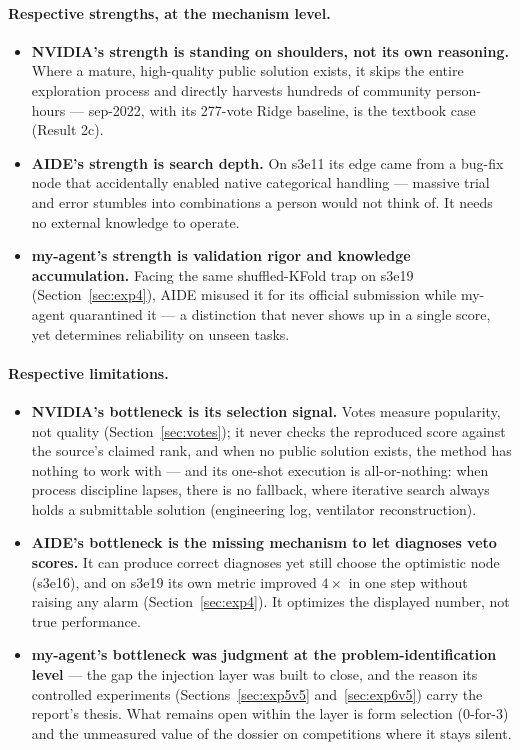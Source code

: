 \documentclass[11pt,a4paper]{article}
\begin{document}
\paragraph{Respective strengths, at the mechanism level.}
\begin{itemize}[leftmargin=*]
\item \textbf{NVIDIA's strength is standing on shoulders, not its own reasoning.} Where a mature, high-quality public solution exists, it skips the entire exploration process and directly harvests hundreds of community person-hours --- sep-2022, with its 277-vote Ridge baseline, is the textbook case (Result 2c).
\item \textbf{AIDE's strength is search depth.} On s3e11 its edge came from a bug-fix node that accidentally enabled native categorical handling --- massive trial and error stumbles into combinations a person would not think of. It needs no external knowledge to operate.
\item \textbf{my-agent's strength is validation rigor and knowledge accumulation.} Facing the same shuffled-KFold trap on s3e19 (Section~\ref{sec:exp4}), AIDE misused it for its official submission while my-agent quarantined it --- a distinction that never shows up in a single score, yet determines reliability on unseen tasks.
\end{itemize}

\paragraph{Respective limitations.}
\begin{itemize}[leftmargin=*]
\item \textbf{NVIDIA's bottleneck is its selection signal.} Votes measure popularity, not quality (Section~\ref{sec:votes}); it never checks the reproduced score against the source's claimed rank, and when no public solution exists, the method has nothing to work with --- and its one-shot execution is all-or-nothing: when process discipline lapses, there is no fallback, where iterative search always holds a submittable solution (engineering log, ventilator reconstruction).
\item \textbf{AIDE's bottleneck is the missing mechanism to let diagnoses veto scores.} It can produce correct diagnoses yet still choose the optimistic node (s3e16), and on s3e19 its own metric improved $4\times$ in one step without raising any alarm (Section~\ref{sec:exp4}). It optimizes the displayed number, not true performance.
\item \textbf{my-agent's bottleneck was judgment at the problem-identification level} --- the gap the injection layer was built to close, and the reason its controlled experiments (Sections~\ref{sec:exp5v5} and~\ref{sec:exp6v5}) carry the report's thesis. What remains open within the layer is form selection (0-for-3) and the unmeasured value of the dossier on competitions where it stays silent.
\end{itemize}
\end{document}
